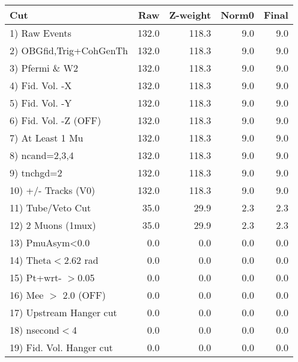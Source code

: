  \begin{table}[h!]\centering
 \begin{tabular}{||l||r|r|r|r||}
 \hline
 \hline
 Cut & Raw & Z-weight & Norm0 & Final \\
 \hline
  1) Raw Events           &       132.0 &       118.3 &         9.0 &         9.0 \\
  2) OBGfid,Trig+CohGenTh &       132.0 &       118.3 &         9.0 &         9.0 \\
  3) Pfermi \& W2         &       132.0 &       118.3 &         9.0 &         9.0 \\
  4) Fid. Vol. -X         &       132.0 &       118.3 &         9.0 &         9.0 \\
  5) Fid. Vol. -Y         &       132.0 &       118.3 &         9.0 &         9.0 \\
  6) Fid. Vol. -Z (OFF)   &       132.0 &       118.3 &         9.0 &         9.0 \\
  7) At Least 1 Mu        &       132.0 &       118.3 &         9.0 &         9.0 \\
  8) ncand=2,3,4          &       132.0 &       118.3 &         9.0 &         9.0 \\
  9) tnchgd=2             &       132.0 &       118.3 &         9.0 &         9.0 \\
 10) +/- Tracks (V0)      &       132.0 &       118.3 &         9.0 &         9.0 \\
 11) Tube/Veto Cut        &        35.0 &        29.9 &         2.3 &         2.3 \\
 12) 2 Muons (1mux)       &        35.0 &        29.9 &         2.3 &         2.3 \\
 13) PmuAsym<0.0          &         0.0 &         0.0 &         0.0 &         0.0 \\
 14) Theta$<$2.62 rad     &         0.0 &         0.0 &         0.0 &         0.0 \\
 15) Pt+wrt- $>$0.05      &         0.0 &         0.0 &         0.0 &         0.0 \\
 16) Mee $>$ 2.0  (OFF)   &         0.0 &         0.0 &         0.0 &         0.0 \\
 17) Upstream Hanger cut  &         0.0 &         0.0 &         0.0 &         0.0 \\
 18) nsecond$<$4          &         0.0 &         0.0 &         0.0 &         0.0 \\
 19) Fid. Vol. Hanger cut &         0.0 &         0.0 &         0.0 &         0.0 \\

\end{tabular}
\end{table}
